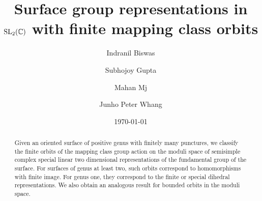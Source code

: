 \documentclass[reqno]{amsart}
\theoremstyle{plain}
\theoremstyle{definition}
\theoremstyle{remark}
\begin{document}
\title[Surface group representations with finite  orbits]{Surface group representations
in ${\rm SL}_2({\mathbb C})$ with finite mapping class orbits}

\author[I. Biswas]{Indranil Biswas}

\address{School of Mathematics, Tata Institute of Fundamental Research, Homi 
Bhabha Road, Mumbai 400005, India}


\author[S. Gupta]{Subhojoy Gupta}

\address{Department of Mathematics, Indian Institute of Science,
Bangalore, India}


\author[M. Mj]{Mahan Mj}

\address{School of Mathematics, Tata Institute of Fundamental Research, Homi 
Bhabha Road, Mumbai 400005, India}


\author[J. P. Whang]{Junho Peter Whang}

\address{Department of Mathematics,
Massachusetts Institute of Technology, 
Office: Building 2 Room 2-238a, 77 Massachusetts Avenue
Cambridge, MA 02139-4307, USA}




\date{\today}

\begin{abstract}
Given an oriented surface of positive genus with finitely many punctures, we classify the finite
orbits of the mapping class group action on the moduli space of semisimple complex special linear two dimensional 
representations of the fundamental group of the surface. For surfaces of genus at least two,
such orbits correspond to  homomorphisms with finite image. For genus one, they correspond
to the finite or special dihedral representations. We also obtain an analogous result for bounded
orbits in the moduli space.
\end{abstract}


\maketitle
\setcounter{tocdepth}{2}
\tableofcontents
\end{document}
